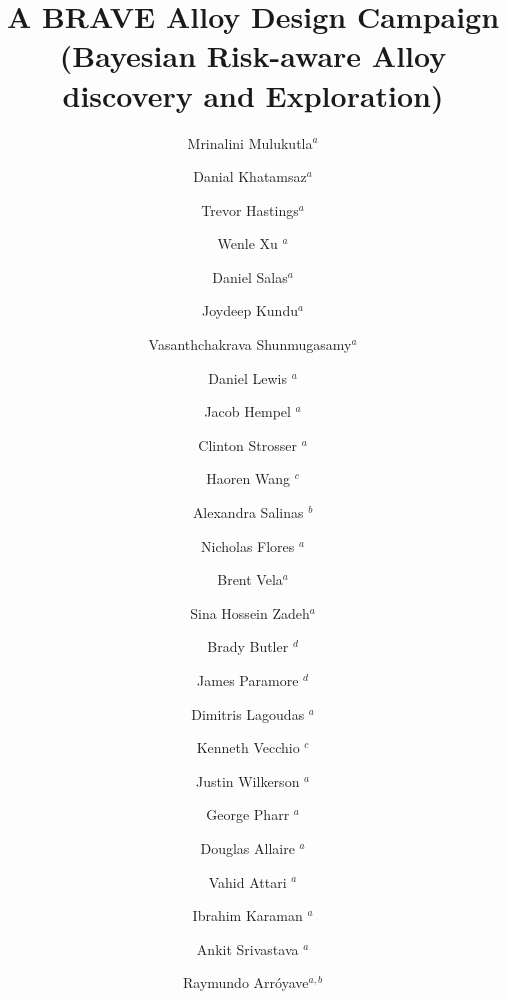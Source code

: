 \documentclass[letterpaper,4pt,times,preprint]{elsarticle}
\begin{document}
\begin{frontmatter}
\title{\Large{A BRAVE Alloy Design Campaign\\
(Bayesian Risk-aware Alloy discovery and Exploration)}}




\author{Mrinalini Mulukutla$^{a}$}
\author{Danial Khatamsaz$^{a}$}
\author{Trevor Hastings$^{a}$}
\author{Wenle Xu $^{a}$}
\author{Daniel Salas$^{a}$}
\author{Joydeep Kundu$^{a}$}
\author{Vasanthchakrava Shunmugasamy$^{a}$}
\author{Daniel Lewis $^{a}$}
\author{Jacob Hempel $^{a}$}
\author{Clinton Strosser $^{a}$}
\author{Haoren Wang $^{c}$}
\author{Alexandra Salinas $^{b}$}
\author{Nicholas Flores $^{a}$}
\author{Brent Vela$^{a}$}
\author{Sina Hossein Zadeh$^{a}$}
\author{Brady Butler $^{d}$}
\author{James Paramore $^{d}$}
\author{Dimitris Lagoudas $^{a}$}
\author{Kenneth Vecchio $^{c}$}
\author{Justin Wilkerson $^{a}$}
\author{George Pharr $^{a}$}
\author{Douglas Allaire $^{a}$}
\author{Vahid Attari $^{a}$}
\author{Ibrahim Karaman $^{a}$}
\author{Ankit Srivastava $^{a}$}
\author{Raymundo Arr\'{o}yave$^{a,b}$}


\address{$^a$Department of Materials Science and Engineering, Texas A\&M University, College Station, TX 77843, USA}
\address{$^b$Mechanical Engineering Department, Texas A\&M University, College Station, TX, USA 77840}
\address{$^c$University of California- San Diego, San Diego, CA 92093}
\address{$^d$DEVCOM Army Research Laboratory South at Texas A\&M University, College Station, TX 77843-3003, USA}



\end{frontmatter}
\end{document}
